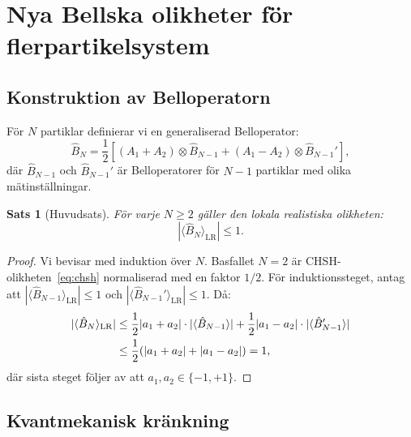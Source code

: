 \documentclass[12pt,a4paper]{article}
\theoremstyle{plain}
\newtheorem{theorem}{Sats}[section]
\theoremstyle{definition}
\theoremstyle{remark}
\begin{document}
\section{Nya Bellska olikheter f\"or flerpartikelsystem}
\label{sec:nya_olikheter}

\subsection{Konstruktion av Belloperatorn}

F\"or $N$ partiklar definierar vi en generaliserad Belloperator:
\begin{equation}
\label{eq:bell_N}
\hat{B}_N = \frac{1}{2} \left[ (A_1 + A_2) \otimes \hat{B}_{N-1} + (A_1 - A_2) \otimes \hat{B}_{N-1}' \right],
\end{equation}
d\"ar $\hat{B}_{N-1}$ och $\hat{B}_{N-1}'$ \"ar Belloperatorer
f\"or $N-1$ partiklar med olika m\"atinst\"allningar.

\begin{theorem}[Huvudsats]
\label{thm:huvudsats}
F\"or varje $N \geq 2$ g\"aller den lokala realistiska olikheten:
\begin{equation}
\label{eq:lr_bound}
|\langle \hat{B}_N \rangle_{\mathrm{LR}}| \leq 1.
\end{equation}
\end{theorem}

\begin{proof}
Vi bevisar med induktion \"over $N$. Basfallet $N = 2$ \"ar
CHSH-olikheten~\eqref{eq:chsh} normaliserad med en faktor
$1/2$. F\"or induktionssteget, antag att $|\langle \hat{B}_{N-1} \rangle_{\mathrm{LR}}| \leq 1$
och $|\langle \hat{B}_{N-1}' \rangle_{\mathrm{LR}}| \leq 1$. D\r{a}:
\begin{align}
|\langle \hat{B}_N \rangle_{\mathrm{LR}}|
&\leq \frac{1}{2} |a_1 + a_2| \cdot |\langle \hat{B}_{N-1} \rangle| + \frac{1}{2} |a_1 - a_2| \cdot |\langle \hat{B}_{N-1}' \rangle| \notag \\
&\leq \frac{1}{2} (|a_1 + a_2| + |a_1 - a_2|) = 1, \label{eq:induction}
\end{align}
d\"ar sista steget f\"oljer av att $a_1, a_2 \in \{-1, +1\}$.
\end{proof}

\subsection{Kvantmekanisk kr\"ankning}
\end{document}
